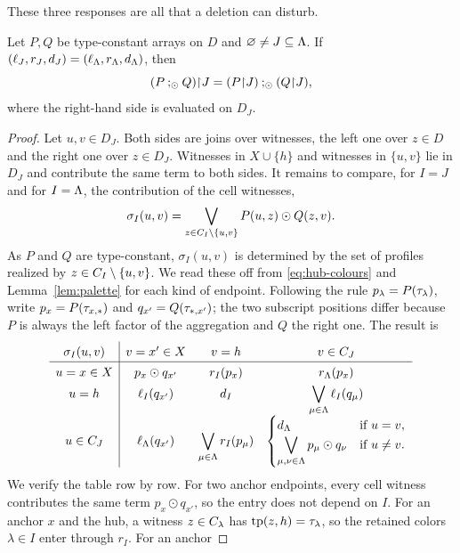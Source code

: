 These three responses are all that a deletion can disturb.
\begin{lemma}\label{lem:local}
Let $P,Q$ be type-constant arrays on $D$ and $\varnothing\ne J\subseteq\Lambda$.
If $(\ell_J,r_J,d_J)=(\ell_{\Lambda},r_{\Lambda},d_{\Lambda})$, then
\[
 (P\mathbin{;_{\odot}} Q)\mathord{\restriction} J=(P\mathord{\restriction} J)\mathbin{;_{\odot}}(Q\mathord{\restriction} J),
\]
where the right-hand side is evaluated on $D_J$.
\end{lemma}
\begin{proof}
Let $u,v\in D_J$. Both sides are joins over witnesses, the left one over
$z\in D$ and the right one over $z\in D_J$. Witnesses in $X\cup\{h\}$ and
witnesses in $\{u,v\}$ lie in $D_J$ and contribute the same term to both
sides. It remains to compare, for $I=J$ and for $I=\Lambda$, the contribution
of the cell witnesses,
\[
 \sigma_I(u,v)=\bigvee_{z\in C_{I}\setminus\{u,v\}}
 P(u,z)\odot Q(z,v).
\]
As $P$ and $Q$ are type-constant, $\sigma_I(u,v)$ is determined by the set
of profiles realized by $z\in C_{I}\setminus\{u,v\}$. We read these off
from \eqref{eq:hub-colours} and Lemma~\ref{lem:palette} for each kind of
endpoint. Following the rule $p_\lambda=P(\tau_{\lambda})$, write $p_x=P(\tau_{x,\ast})$ and
$q_{x'}=Q(\tau_{\ast,x'})$; the two subscript positions differ because $P$ is
always the left factor of the aggregation and $Q$ the right one. The result
is
\begin{equation}\label{eq:response-table}
\renewcommand{\arraystretch}{1.35}
\begin{array}{c|ccc}
 \sigma_I(u,v)& v=x'\in X&v=h&v\in\cell J\\ \hline
 u=x\in X&p_x\odot q_{x'}&r_I(p_x)&r_{\Col}(p_x)\\[1pt]
 u=h&\ell_I(q_{x'})&d_I&\displaystyle\bigvee_{\mu\in\Col}\ell_I(q_\mu)\\[3pt]
 u\in\cell J&\ell_{\Col}(q_{x'})&\displaystyle\bigvee_{\mu\in\Col}r_I(p_\mu)&
 \begin{cases}d_{\Col}&\text{if }u=v,\\[1pt]
 \displaystyle\bigvee_{\mu,\nu\in\Col}p_\mu\odot q_\nu&\text{if }u\ne v.\end{cases}
\end{array}
\end{equation}
We verify the table row by row. For two anchor endpoints, every cell witness
contributes the same term $p_x\odot q_{x'}$, so the entry does not depend on
$I$. For an anchor $x$ and the hub, a witness $z\in C_{\lambda}$ has
$\operatorname{tp}(z,h)=\tau_{\lambda}$, so the retained colors $\lambda\in I$ enter
through $r_I$. For an anchor

\end{proof}
